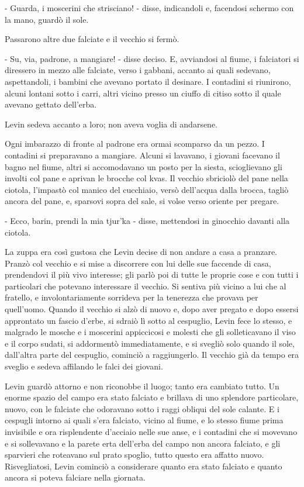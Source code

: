 - Guarda, i moscerini che strisciano! - disse, indicandoli e, facendosi schermo con la mano, guardò il sole. 

Passarono altre due falciate e il vecchio si fermò. 

- Su, via, padrone, a mangiare! - disse deciso. E, avviandosi al fiume, i falciatori si diressero in mezzo alle falciate, verso i gabbani, accanto ai quali sedevano, aspettandoli, i bambini che avevano portato il desinare. I contadini si riunirono, alcuni lontani sotto i carri, altri vicino presso un ciuffo di citiso sotto il quale avevano gettato dell'erba. 

Levin sedeva accanto a loro; non aveva voglia di andarsene. 

Ogni imbarazzo di fronte al padrone era ormai scomparso da un pezzo. I contadini si preparavano a mangiare. Alcuni si lavavano, i giovani facevano il bagno nel fiume, altri si accomodavano un posto per la siesta, scioglievano gli involti col pane e aprivan le brocche col kvas. Il vecchio sbriciolò del pane nella ciotola, l'impastò col manico del cucchiaio, versò dell'acqua dalla brocca, tagliò ancora del pane, e, sparsovi sopra del sale, si volse verso oriente per pregare. 

- Ecco, barin, prendi la mia tjur'ka - disse, mettendosi in ginocchio davanti alla ciotola. 

La zuppa era così gustosa che Levin decise di non andare a casa a pranzare. Pranzò col vecchio e si mise a discorrere con lui delle sue faccende di casa, prendendovi il più vivo interesse; gli parlò poi di tutte le proprie cose e con tutti i particolari che potevano interessare il vecchio. Si sentiva più vicino a lui che al fratello, e involontariamente sorrideva per la tenerezza che provava per quell'uomo. Quando il vecchio si alzò di nuovo e, dopo aver pregato e dopo essersi approntato un fascio d'erbe, si sdraiò lì sotto al cespuglio, Levin fece lo stesso, e malgrado le mosche e i moscerini appiccicosi e molesti che gli solleticavano il viso e il corpo sudati, si addormentò immediatamente, e si svegliò solo quando il sole, dall'altra parte del cespuglio, cominciò a raggiungerlo. Il vecchio già da tempo era sveglio e sedeva affilando le falci dei giovani. 

Levin guardò attorno e non riconobbe il luogo; tanto era cambiato tutto. Un enorme spazio del campo era stato falciato e brillava di uno splendore particolare, nuovo, con le falciate che odoravano sotto i raggi obliqui del sole calante. E i cespugli intorno ai quali s'era falciato, vicino al fiume, e lo stesso fiume prima invisibile e ora risplendente d'acciaio nelle sue anse, e i contadini che si movevano e si sollevavano e la parete erta dell'erba del campo non ancora falciato, e gli sparvieri che roteavano sul prato spoglio, tutto questo era affatto nuovo. Risvegliatosi, Levin cominciò a considerare quanto era stato falciato e quanto ancora si poteva falciare nella giornata. 

